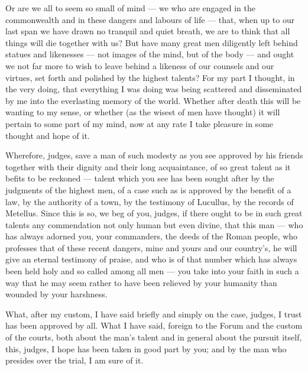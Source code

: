  Or are we all to seem so small of mind --- we who are engaged in the commonwealth and in these dangers and labours of life --- that, when up to our last span we have drawn no tranquil and quiet breath, we are to think that all things will die together with us? But have many great men diligently left behind statues and likenesses --- not images of the mind, but of the body --- and ought we not far more to wish to leave behind a likeness of our counsels and our virtues, set forth and polished by the highest talents? For my part I thought, in the very doing, that everything I was doing was being scattered and disseminated by me into the everlasting memory of the world. Whether after death this will be wanting to my sense, or whether (as the wisest of men have thought) it will pertain to some part of my mind, now at any rate I take pleasure in some thought and hope of it.

 Wherefore, judges, save a man of such modesty as you see approved by his friends together with their dignity and their long acquaintance, of so great talent as it befits to be reckoned --- talent which you see has been sought after by the judgments of the highest men, of a case such as is approved by the benefit of a law, by the authority of a town, by the testimony of Lucullus, by the records of Metellus. Since this is so, we beg of you, judges, if there ought to be in such great talents any commendation not only human but even divine, that this man --- who has always adorned you, your commanders, the deeds of the Roman people, who professes that of these recent dangers, mine and yours and our country's, he will give an eternal testimony of praise, and who is of that number which has always been held holy and so called among all men --- you take into your faith in such a way that he may seem rather to have been relieved by your humanity than wounded by your harshness.

 What, after my custom, I have said briefly and simply on the case, judges, I trust has been approved by all. What I have said, foreign to the Forum and the custom of the courts, both about the man's talent and in general about the pursuit itself, this, judges, I hope has been taken in good part by you; and by the man who presides over the trial, I am sure of it.




